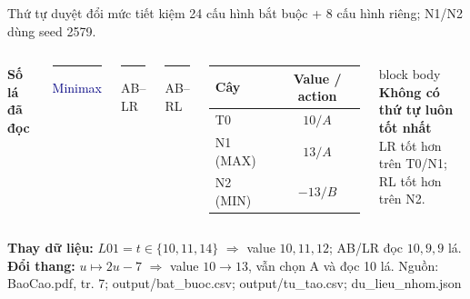 \documentclass[aspectratio=169,10pt]{beamer}
\newcommand{\smallsource}[1]{\vfill{\scriptsize\textcolor{Muted}{Nguồn: #1}}}
\begin{document}
\begin{frame}{Thứ tự duyệt đổi mức tiết kiệm}
\small 24 cấu hình bắt buộc + 8 cấu hình riêng; N1/N2 dùng seed 2579.
\par\vspace{5pt}
\begin{columns}[T,onlytextwidth]
\centering
\textbf{Số lá đã đọc}\par\vspace{6pt}
\vspace{3pt}
\par\centering\scriptsize
\textcolor{Navy}{\rule{5pt}{5pt} Minimax}\hspace{.18cm}%
\textcolor{BarLR}{\rule{5pt}{5pt} AB--LR}\hspace{.18cm}%
\textcolor{BarRL}{\rule{5pt}{5pt} AB--RL}
\centering\small
\begin{tabular}{l c}
\toprule\textbf{Cây} & \textbf{Value / action}\\\midrule
T0 & $10/A$\\
N1 (MAX) & $13/A$\\
N2 (MIN) & $-13/B$\\\bottomrule
\end{tabular}
\par\vspace{8pt}
\begin{beamercolorbox}[rounded=true,sep=8pt,wd=\linewidth]{block body}
\textbf{Không có thứ tự luôn tốt nhất}\\
LR tốt hơn trên T0/N1; RL tốt hơn trên N2.
\end{beamercolorbox}
\end{columns}
\vspace{7pt}\small
\textbf{Thay dữ liệu:} $L01=t\in\{10,11,14\}$ $\Rightarrow$ value $10,11,12$; AB/LR đọc $10,9,9$ lá.\\[3pt]
\textbf{Đổi thang:} $u\mapsto2u-7$ $\Rightarrow$ value $10\to13$, vẫn chọn A và đọc 10 lá.
\smallsource{BaoCao.pdf, tr. 7; output/bat\_buoc.csv; output/tu\_tao.csv; du\_lieu\_nhom.json}
\end{frame}
\end{document}
